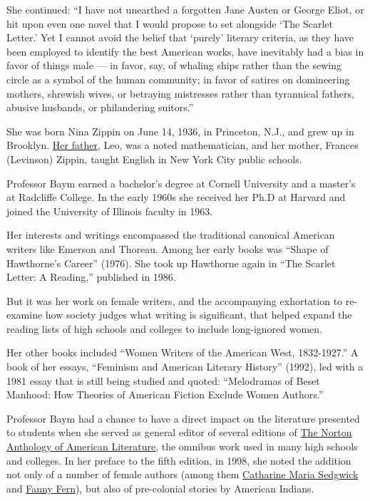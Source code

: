She continued: ``I have not unearthed a forgotten Jane Austen or George
Eliot, or hit upon even one novel that I would propose to set alongside
`The Scarlet Letter.' Yet I cannot avoid the belief that `purely'
literary criteria, as they have been employed to identify the best
American works, have inevitably had a bias in favor of things male ---
in favor, say, of whaling ships rather than the sewing circle as a
symbol of the human community; in favor of satires on domineering
mothers, shrewish wives, or betraying mistresses rather than tyrannical
fathers, abusive husbands, or philandering suitors.''

She was born Nina Zippin on June 14, 1936, in Princeton, N.J., and grew
up in Brooklyn.
\href{https://www.nytimes3xbfgragh.onion/1995/05/20/obituaries/leo-zippin-90-dies-solved-math-puzzle.html}{Her
father}, Leo, was a noted mathematician, and her mother, Frances
(Levinson) Zippin, taught English in New York City public schools.

Professor Baym earned a bachelor's degree at Cornell University and a
master's at Radcliffe College. In the early 1960s she received her Ph.D
at Harvard and joined the University of Illinois faculty in 1963.

Her interests and writings encompassed the traditional canonical
American writers like Emerson and Thoreau. Among her early books was
``Shape of Hawthorne's Career'' (1976). She took up Hawthorne again in
``The Scarlet Letter: A Reading,'' published in 1986.

But it was her work on female writers, and the accompanying exhortation
to re-examine how society judges what writing is significant, that
helped expand the reading lists of high schools and colleges to include
long-ignored women.

Her other books included ``Women Writers of the American West,
1832-1927.'' A book of her essays, ``Feminism and American Literary
History'' (1992), led with a 1981 essay that is still being studied and
quoted: ``Melodramas of Beset Manhood: How Theories of American Fiction
Exclude Women Authors.''

Professor Baym had a chance to have a direct impact on the literature
presented to students when she served as general editor of several
editions of
\href{http://books.wwnorton.com/books/college-subject.aspx?id=4294983309}{The
Norton Anthology of American Literature}, the omnibus work used in many
high schools and colleges. In her preface to the fifth edition, in 1998,
she noted the addition not only of a number of female authors (among
them
\href{http://www.womenhistoryblog.com/2012/01/catharine-maria-sedgwick.html}{Catharine
Maria Sedgwick} and \href{https://fannyfern.org/bio}{Fanny Fern}), but
also of pre-colonial stories by American Indians.

